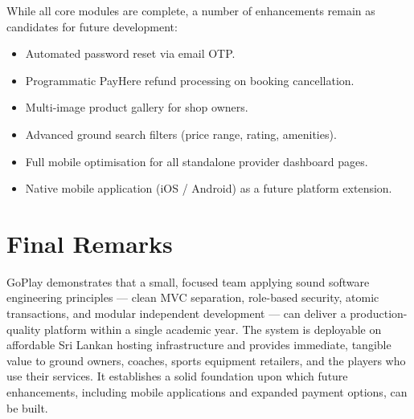 \documentclass[12pt,a4paper]{report}
\begin{document}
While all core modules are complete, a number of enhancements remain as candidates for future development:

\begin{itemize}[leftmargin=1.5cm]
  \item Automated password reset via email OTP.
  \item Programmatic PayHere refund processing on booking cancellation.
  \item Multi-image product gallery for shop owners.
  \item Advanced ground search filters (price range, rating, amenities).
  \item Full mobile optimisation for all standalone provider dashboard pages.
  \item Native mobile application (iOS / Android) as a future platform extension.
\end{itemize}

\section{Final Remarks}

GoPlay demonstrates that a small, focused team applying sound software engineering principles — clean MVC separation, role-based security, atomic transactions, and modular independent development — can deliver a production-quality platform within a single academic year. The system is deployable on affordable Sri Lankan hosting infrastructure and provides immediate, tangible value to ground owners, coaches, sports equipment retailers, and the players who use their services. It establishes a solid foundation upon which future enhancements, including mobile applications and expanded payment options, can be built.
\end{document}
